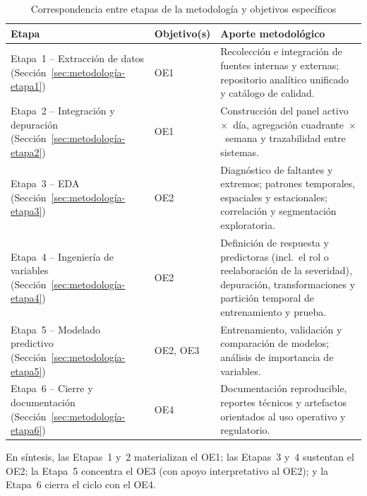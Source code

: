 \begin{table}[!htbp]
\centering
\small
\caption{Correspondencia entre etapas de la metodología y objetivos específicos}
\label{tab:etapas_objetivos}
\begin{tabular}{@{}>{\raggedright\arraybackslash}p{3.6cm} >{\centering\arraybackslash}p{1.6cm} >{\raggedright\arraybackslash}p{7.6cm}@{}}
\toprule
\textbf{Etapa} & \textbf{Objetivo(s)} & \textbf{Aporte metodológico} \\
\midrule
Etapa~1 -- Extracción de datos
  (Sección~\ref{sec:metodología-etapa1})
  & OE1
  & Recolección e integración de fuentes internas y externas; repositorio analítico unificado y catálogo de calidad. \\
\addlinespace
Etapa~2 -- Integración y depuración
  (Sección~\ref{sec:metodología-etapa2})
  & OE1
  & Construcción del panel activo~$\times$~día, agregación cuadrante~$\times$~semana y trazabilidad entre sistemas. \\
\addlinespace
Etapa~3 -- EDA
  (Sección~\ref{sec:metodología-etapa3})
  & OE2
  & Diagnóstico de faltantes y extremos; patrones temporales, espaciales y estacionales; correlación y segmentación exploratoria. \\
\addlinespace
Etapa~4 -- Ingeniería de variables
  (Sección~\ref{sec:metodología-etapa4})
  & OE2
  & Definición de respuesta y predictoras (incl.~el rol o reelaboración de la severidad), depuración, transformaciones y partición temporal de entrenamiento y prueba. \\
\addlinespace
Etapa~5 -- Modelado predictivo
  (Sección~\ref{sec:metodología-etapa5})
  & OE2, OE3
  & Entrenamiento, validación y comparación de modelos; análisis de importancia de variables. \\
\addlinespace
Etapa~6 -- Cierre y documentación
  (Sección~\ref{sec:metodología-etapa6})
  & OE4
  & Documentación reproducible, reportes técnicos y artefactos orientados al uso operativo y regulatorio. \\
\bottomrule
\end{tabular}
\end{table}

\noindent En síntesis, las Etapas~1 y~2 materializan el OE1; las Etapas~3 y~4 sustentan el OE2; la Etapa~5 concentra el OE3 (con apoyo interpretativo al OE2); y la Etapa~6 cierra el ciclo con el OE4.
